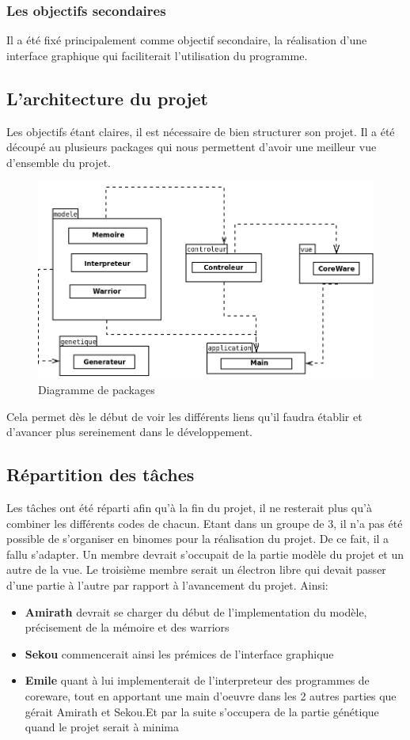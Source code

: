 \documentclass[12pt]{article}
\begin{document}
\subsubsection*{Les objectifs secondaires}
Il a été fixé principalement comme objectif secondaire, la réalisation d'une interface graphique qui faciliterait l'utilisation du programme.
\subsection{L'architecture du projet}
Les objectifs étant claires, il est nécessaire de bien structurer son projet. Il a été découpé au plusieurs packages qui nous permettent d'avoir une meilleur vue d'ensemble du projet.

\begin{figure}[h!]
	\center
	\includegraphics[scale=0.5]{Images/diagrammeDePackage.png}
	\caption{Diagramme de packages}
\end{figure}
Cela permet dès le début de voir les différents liens qu'il faudra établir et d'avancer plus sereinement dans le développement.
\subsection{Répartition des tâches}
Les tâches ont été réparti afin qu'à la fin du projet, il ne resterait plus qu'à combiner les différents codes de chacun. Etant dans un groupe de 3, il n'a pas été possible de s'organiser en binomes pour la réalisation du projet. De ce fait, il a fallu s'adapter. Un membre devrait s'occupait de la partie modèle du projet et un autre de la vue. Le troisième membre serait un électron libre qui devait passer d'une partie à l'autre par rapport à l'avancement du projet. Ainsi:
\begin{itemize}
	\item \textbf{Amirath} devrait se charger du début de l'implementation du modèle, précisement de la mémoire et des warriors
	\item \textbf{Sekou} commencerait ainsi les prémices de l'interface graphique
	\item \textbf{Emile} quant à lui implementerait de l'interpreteur des programmes de coreware, tout en apportant une main d'oeuvre dans les 2 autres parties que gérait Amirath et Sekou.Et par la suite s'occupera de la partie 
			génétique quand le projet serait à minima
\end{itemize}
\end{document}
